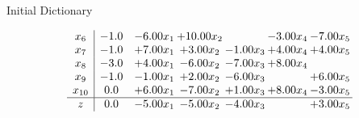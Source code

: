 \documentclass[8pt]{article}
\begin{document}
Initial Dictionary 

\[\begin{array}{c| c c@{\hskip 2pt} c@{\hskip 2pt} c@{\hskip 2pt} c@{\hskip 2pt} c@{\hskip 2pt} }
 x_{6}   &  -1.0 & -6.00 x_{1} & + 10.00 x_{2} &   & -3.00 x_{4} & -7.00 x_{5}\\
 x_{7}   &  -1.0 & +  7.00 x_{1} & +  3.00 x_{2} & -1.00 x_{3} & +  4.00 x_{4} & +  4.00 x_{5}\\
 x_{8}   &  -3.0 & +  4.00 x_{1} & -6.00 x_{2} & -7.00 x_{3} & +  8.00 x_{4} &   \\
 x_{9}   &  -1.0 & -1.00 x_{1} & +  2.00 x_{2} & -6.00 x_{3} &   & +  6.00 x_{5}\\
 x_{10}   &  0.0 & +  6.00 x_{1} & -7.00 x_{2} & +  1.00 x_{3} & +  8.00 x_{4} & -3.00 x_{5}\\
\hline
z    &  0.0 & -5.00 x_{1} & -5.00 x_{2} & -4.00 x_{3} &   & +  3.00 x_{5}\\
\end{array}\]
\end{document}
